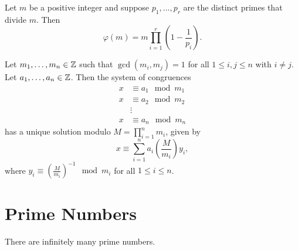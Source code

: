 \documentclass[10pt]{article}
\begin{document}
\begin{corollary*}
    Let $m$ be a positive integer and suppose $p_1,\ldots,p_r$ are the distinct primes that divide $m$. Then
    \[\varphi(m) = m \prod_{i=1}^{r}\left( 1 - \frac{1}{p_i}\right).\]
\end{corollary*}

\begin{comment}
\begin{theorem}[Chinese Remainder Theorem]
Let $m$ and $n$ be integers satisfying $\gcd(m,n)=1$, and let $b$ and $c$ be any integers. Then the simultaneous congruences
    \[x \equiv b \mod{m} \quad \textnormal{and} \quad x \equiv c \mod{n}\]
have exactly one solution with $0 \leq x < mn$.
\end{theorem}

\begin{theorem*}[Chinese Remainder Theorem]
    (Version 2) Let $m,n$ be integers satisfying $\gcd(m,n)=1$, and let $b$ and $c$ be any integers. Then there is a unique $x \in \Z_{mn}$ such that
    \[x \equiv b \mod{m} \quad \textnormal{and} \quad x \equiv c \mod{n}.\]
\end{theorem*}
\end{comment}

\begin{theorem*}[\textcolor{red}{Generalized Chinese Remainder Theorem}]
Let $m_1,\ldots,m_n \in \mathbb{Z}$ such that $\gcd(m_i,m_j)=1$ for all $1 \leq i,j \leq n$ with $i \neq j$. Let $a_1,\ldots,a_n \in \mathbb{Z}$. Then the system of congruences
    \begin{align*}
        x &\equiv a_1 \mod{m_1}
    \\  x &\equiv a_2 \mod{m_2}
        \\&\vdots
    \\  x &\equiv a_n \mod{m_n}
\end{align*}
    has a unique solution modulo $M=\prod_{i=1}^n m_i$, given by 
    \[x \equiv \sum_{i=1}^n a_i \left(\frac{M}{m_i} \right) y_i,\]
    where $y_i \equiv \left(\frac{M}{m_i}\right)^{-1} \mod{m_i}$ for all $1 \leq i \leq n$.
\end{theorem*}

\section{Prime Numbers}

\begin{theorem}[\textcolor{red}{Infinitude of Primes}]
There are infinitely many prime numbers.
\end{theorem}
\end{document}
